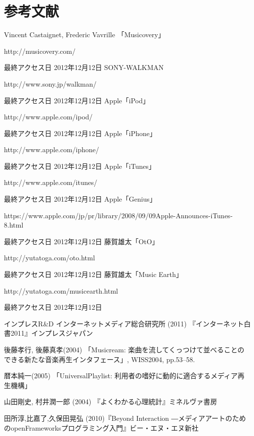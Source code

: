 \documentclass[11pt, onecolumn]{jsarticle}
\begin{document}
\section{参考文献}
\begin{thebibliography}{99}
Vincent Castaignet, Frederic Vavrille 「Musicovery」
\par
http://musicovery.com/
\par
最終アクセス日 2012年12月12日
SONY-WALKMAN
\par
http://www.sony.jp/walkman/
\par
最終アクセス日 2012年12月12日
Apple「iPod」
\par
http://www.apple.com/ipod/
\par
最終アクセス日 2012年12月12日
Apple「iPhone」
\par
http://www.apple.com/iphone/
\par
最終アクセス日 2012年12月12日
Apple「iTunes」
\par
http://www.apple.com/itunes/
\par
最終アクセス日 2012年12月12日
Apple「Genius」
\par
https://www.apple.com/jp/pr/library/2008/09/09Apple-Announces-iTunes-8.html
\par
最終アクセス日 2012年12月12日
藤賀雄太「OtO」
\par
http://yutatoga.com/oto.html
\par
最終アクセス日 2012年12月12日
藤賀雄太「Music Earth」
\par
http://yutatoga.com/musicearth.html
\par
最終アクセス日 2012年12月12日

インプレスR\&D インターネットメディア総合研究所 (2011) 『インターネット白書2011』インプレスジャパン

後藤孝行, 後藤真孝(2004)
「Musicream: 楽曲を流してくっつけて並べることのできる新たな音楽再生インタフェース」, WISS2004, pp.53--58.

暦本純一(2005)
「UniversalPlaylist: 利用者の嗜好に動的に適合するメディア再生機構」

山田剛史, 村井潤一郎 (2004) 『よくわかる心理統計』ミネルヴァ書房

田所淳,比嘉了,久保田晃弘 (2010)『Beyond Interaction ―メディアアートのためのopenFrameworksプログラミング入門』ビー・エヌ・エヌ新社
\end{thebibliography}
\end{document}
